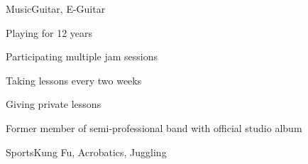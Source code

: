 \documentclass[a4paper,10pt]{cv}
\begin{document}
    \vspace{-1em}
    \begin{multicols}{2}
      \begin{cvTimeItem}{Music}{Guitar, E-Guitar}
        \begin{cvItemize}
          \item Playing for 12 years
          \item Participating multiple jam sessions
          \item Taking lessons every two weeks
          \item Giving private lessons
          \item Former member of semi-professional band  with official studio album
        \end{cvItemize}
      \end{cvTimeItem}
      \begin{cvTimeItem}{Sports}{Kung Fu, Acrobatics, Juggling}
      \end{cvTimeItem}
    \end{multicols}
\end{document}
